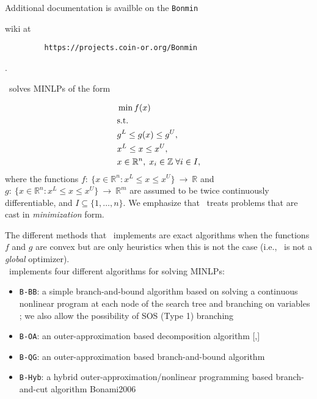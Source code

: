 Additional documentation is availble on the {\tt Bonmin}
\begin{latexonly} wiki at 
\begin{verbatim}
         https://projects.coin-or.org/Bonmin
\end{verbatim}
\end{latexonly}
\begin{htmlonly} . \end{htmlonly}
\Bonmin\ solves MINLPs of the form

\begin{align*}
&\min f(x) \\
& {\rm s.t.} \\
&g^L \leq g(x) \leq g^U,\\
& x^L \leq x \leq x^U, \\
&x \in \mathbb{R}^n, \;  x_i \in \mathbb{Z} \; \forall i \in I,
\end{align*}
where the functions $f :~\{x\in \mathbb{R}^n : x^L \leq x \leq x^U
\}~ \rightarrow~\mathbb{R}$ and $g:~\{x\in \mathbb{R}^n : x^L \leq x
\leq x^U \}~\rightarrow~\mathbb{R}^m$ are assumed to be twice
continuously differentiable, and $I \subseteq \{1, \ldots,n \}$. We
emphasize that \Bonmin\ treats problems that are cast
in {\em minimization} form.

The different methods that \Bonmin\ implements are exact algorithms when the functions $f$ and $g$ are
convex but are only heuristics when this is not the case (i.e., \Bonmin\ is not a \emph{global} optimizer).\\

\Bonmin\ implements four different algorithms for solving
MINLPs:

\begin{itemize}
\item {\tt B-BB}: a simple branch-and-bound algorithm based on solving
a continuous nonlinear program at each node of the search tree and
branching on variables ;
we also allow the possibility of SOS (Type 1) branching
\item {\tt B-OA}: an outer-approximation based decomposition algorithm
{[,]}
\item {\tt B-QG}: an outer-approximation based branch-and-bound
algorithm
\item {\tt B-Hyb}: a hybrid outer-approximation/nonlinear programming
based branch-and-cut algorithm 
{\BetalLink}{Bonami2006}
\end{itemize}

